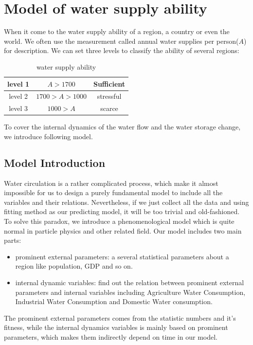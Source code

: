 \section{Model of water supply ability}
  When it come to the water supply ability of a region, a country or even the world. We often use the measurement called annual water supplies per person($A$) for description\cite{AbilityMeasure}. We can set three levels to classify the ability of several regions:
  \begin{table}[!htb]
    \centering
    \begin{tabular}{|c||c|c|}
    \hline
    level 1   & $A>1700$ & Sufficient \\
    \hline
    level 2   & $1700>A>1000$ & stressful \\
    \hline
    level 3   & $1000>A$ & scarce \\
    \hline
    \end{tabular}
    \caption{water supply ability}
  \end{table}

To cover the internal dynamics of the water flow and the water storage change, we introduce following model.

  \subsection{Model Introduction}
    Water circulation is a rather complicated process, which make it almost impossible for us to design a purely fundamental model to include all the variables and their relations. Nevertheless, if we just collect all the data and using fitting method as our predicting model, it will be too trivial and old-fashioned. To solve this paradox, we introduce a phenomenological model which is quite normal in particle physics and other related field. Our model includes two main parts:
    \begin{itemize}
      \item prominent external parameters: a several statistical parameters about a region like population, GDP and so on.
      \item internal dynamic variables: find out the relation between prominent external parameters and internal variables including Agriculture Water Consumption, Industrial Water Consumption and Domestic Water consumption.
    \end{itemize}
    The prominent external parameters comes from the statistic numbers and it's fitness, while the internal dynamics variables is mainly based on prominent parameters, which makes them indirectly depend on time in our model.

